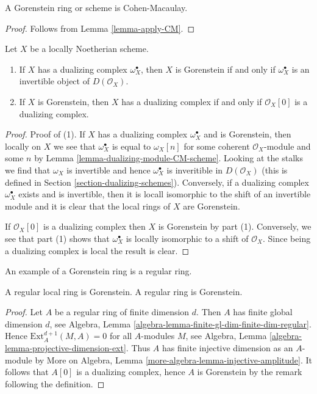 \begin{lemma}
\label{lemma-gorenstein-CM}
A Gorenstein ring or scheme is Cohen-Macaulay.
\end{lemma}

\begin{proof}
Follows from Lemma \ref{lemma-apply-CM}.
\end{proof}

\begin{lemma}
\label{lemma-gorenstein}
Let $X$ be a locally Noetherian scheme.
\begin{enumerate}
\item If $X$ has a dualizing complex $\omega_X^\bullet$, then
$X$ is Gorenstein if and only if $\omega_X^\bullet$ is an invertible
object of $D(\mathcal{O}_X)$.
\item If $X$ is Gorenstein, then $X$ has a dualizing complex if and
only if $\mathcal{O}_X[0]$ is a dualizing complex.
\end{enumerate}
\end{lemma}

\begin{proof}
Proof of (1).
If $X$ has a dualizing complex $\omega_X^\bullet$ and is Gorenstein, then
locally on $X$ we see that $\omega_X^\bullet$ is equal to $\omega_X[n]$
for some coherent $\mathcal{O}_X$-module and some $n$ by
Lemma \ref{lemma-dualizing-module-CM-scheme}. Looking at the stalks
we find that $\omega_X$ is invertible and hence $\omega_X^\bullet$
is inveritible in $D(\mathcal{O}_X)$ (this is defined in
Section \ref{section-dualizing-schemes}). Conversely, if a
dualizing complex $\omega_X^\bullet$ exists and is invertible,
then it is locall isomorphic
to the shift of an invertible module and it is clear that the local
rings of $X$ are Gorenstein.

\medskip\noindent
If $\mathcal{O}_X[0]$ is a dualizing complex then $X$ is Gorenstein by
part (1). Conversely, we see that part (1) shows that
$\omega_X^\bullet$ is locally isomorphic to a shift of $\mathcal{O}_X$.
Since being a dualizing complex is local the result is clear.
\end{proof}

\noindent
An example of a Gorenstein ring is a regular ring.

\begin{lemma}
\label{lemma-regular-gorenstein}
A regular local ring is Gorenstein.
A regular ring is Gorenstein.
\end{lemma}

\begin{proof}
Let $A$ be a regular ring of finite dimension $d$. Then $A$ has finite
global dimension $d$, see
Algebra, Lemma \ref{algebra-lemma-finite-gl-dim-finite-dim-regular}.
Hence $\text{Ext}^{d + 1}_A(M, A) = 0$ for all $A$-modules $M$, see
Algebra, Lemma \ref{algebra-lemma-projective-dimension-ext}.
Thus $A$ has finite injective dimension as an $A$-module by
More on Algebra, Lemma \ref{more-algebra-lemma-injective-amplitude}.
It follows that $A[0]$ is a dualizing complex, hence $A$ is
Gorenstein by the remark following the definition.
\end{proof}

